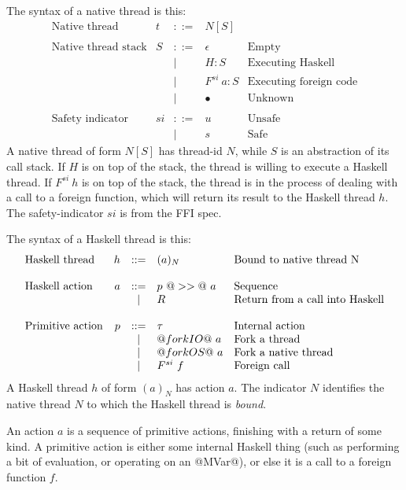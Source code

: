 \documentclass{article}
\newcommand{\hcall}{H}
\newcommand{\fcall}[2]{F^{#1}~#2}
\newcommand{\ret}[1]{R~#1}
\begin{document}
The syntax of a native thread is this:
$$
\begin{array}{lrcll}
\mbox{Native thread} &  t & ::= & N[S] \\
\\
\mbox{Native thread stack} &  S & ::= & \epsilon & \mbox{Empty}\\
        & & | & \hcall : S  & \mbox{Executing Haskell} \\
        & & | & \fcall{si}{a} : S & \mbox{Executing foreign code} \\
        & & | & \bullet & \mbox{Unknown}\\
\\
\mbox{Safety indicator} &  si & ::= & u & \mbox{Unsafe} \\
        & & | & s & \mbox{Safe}
\end{array}
$$
A native thread of form $N[S]$ has thread-id $N$, while $S$ is
an abstraction of its call stack.  If $\hcall$ is on top of the stack,
the thread is willing to execute a Haskell thread.
If $\fcall{si}{h}$ is
on top of the stack, the thread is in the process of dealing with a call
to a foreign function, which will return its result to the Haskell thread
$h$.  The safety-indicator $si$ is from the FFI spec.

The syntax of a Haskell thread is this:
$$
\begin{array}{lrcll}
\mbox{Haskell thread} &  h & ::= & (a)_{N} & \mbox{Bound to native thread N} \\
\\
\mbox{Haskell action} &  a & ::= & p ~@>>@~ a  & \mbox{Sequence} \\
        & & | & \ret  & \mbox{Return from a call into Haskell} \\
\\
\mbox{Primitive action} &  p & ::= & \tau & \mbox{Internal action} \\
        & & | & @forkIO@~a & \mbox{Fork a thread} \\
        & & | & @forkOS@~a & \mbox{Fork a native thread} \\
        & & | & \fcall{si}{f} & \mbox{Foreign call} 
\end{array}
$$
A Haskell thread $h$ of form $(a)_{N}$ has action $a$.  The indicator
$N$ identifies the native thread $N$ to which the Haskell thread is \emph{bound}.

An action $a$ is a sequence of primitive actions, finishing with a 
return of some kind.  A primitive action is either some internal Haskell
thing (such as performing a bit of evaluation, or operating on an @MVar@),
or else it is a call to a foreign function $f$.
\end{document}
